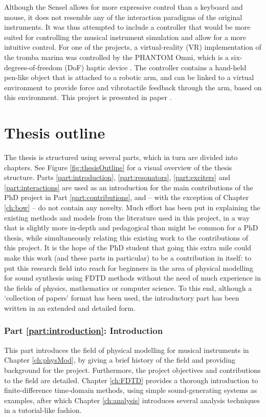 Although the Sensel allows for more expressive control than a keyboard and mouse, it does not resemble any of the interaction paradigms of the original instruments. It was thus attempted to include a controller that would be more suited for controlling the musical instrument simulation and allow for a more intuitive control.
For one of the projects, a virtual-reality (VR) implementation of the tromba marina was controlled by the PHANTOM Omni, which is a six-degrees-of-freedom (DoF) haptic device \cite{phantom}. The controller contains a hand-held pen-like object that is attached to a robotic arm, and can be linked to a virtual environment to provide force and vibrotactile feedback through the arm, based on this environment. This project is presented in paper \citeP[E].

\section{Thesis outline}
The thesis is structured using several parts, which in turn are divided into chapters. See Figure \ref{fig:thesisOutline} for a visual overview of the thesis structure. Parts \ref{part:introduction}, \ref{part:resonators}, \ref{part:exciters} and \ref{part:interactions} are used as an introduction for the main contributions of the PhD project in Part \ref{part:contributions}, and -- with the exception of Chapter \ref{ch:bow} -- do not contain any novelty. Much effort has been put in explaining the existing methods and models from the literature used in this project, in a way that is slightly more in-depth and pedagogical than might be common for a PhD thesis, while simultaneously relating this existing work to the contributions of this project. It is the hope of the PhD student that going this extra mile could make this work (and these parts in particular) to be a contribution in itself: to put this research field into reach for beginners in the area of physical modelling for sound synthesis using FDTD methods without the need of much experience in the fields of physics, mathematics or computer science. To this end, although a `collection of papers' format has been used, the introductory part has been written in an extended and detailed form.

\subsubsection{Part \ref{part:introduction}: Introduction}
This part introduces the field of physical modelling for musical instruments in Chapter \ref{ch:physMod}, by giving a brief history of the field and providing background for the project. Furthermore, the project objectives and contributions to the field are detailed. Chapter \ref{ch:FDTD} provides a thorough introduction to finite-difference time-domain methods, using simple sound-generating systems as examples, after which Chapter \ref{ch:analysis} introduces several analysis techniques in a tutorial-like fashion.

